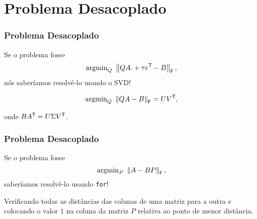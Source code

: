 
\section{Problema Desacoplado}

\begin{frame}[fragile]
  \frametitle{Problema Desacoplado}

  \begin{center}
    Se o problema fosse \[\text{argmin}_{Q}\,\, \left\lVert QA .+ \tau e^{\mathsf{T}\mkern-1mu} - B\right\rVert_\mathsf{F},\] nós saberíamos resolvê-lo usando o SVD!

  \pause

  \[\text{argmin}_{Q}\,\, \left\lVert QA - B\right\rVert_\mathsf{F} = U V^{\mathsf{T}\mkern-1mu},\]

  onde $B A^{\mathsf{T}\mkern-1mu} = U \Sigma V^{\mathsf{T}\mkern-1mu}$.
  \end{center}


\end{frame}

\begin{frame}[fragile]
  \frametitle{Problema Desacoplado}

  \begin{center}
    Se o problema fosse \[\text{argmin}_{P}\,\, \left\lVert A - BP\right\rVert_\mathsf{F},\] saberíamos resolvê-lo usando \texttt{for}!

    \pause

    Verificando todas as distâncias das colunas de uma matriz para a outra e colocando o valor $1$ na coluna da matriz $P$ relativa ao ponto de menor distância.
  \end{center}
\end{frame}
